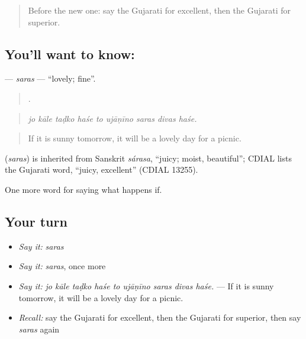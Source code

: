 \label{lesson:GU-C387-saras}



\begin{quote}
Before the new one: say the Gujarati for excellent, then the Gujarati for superior.
\end{quote}

\subsection*{You'll want to know: }
\textbf{} — \emph{saras} — \textquotedblleft{}lovely; fine\textquotedblright{}.

\begin{quote}
        .
\end{quote}

\begin{quote}
\emph{jo kāle taḍko haśe to ujāṇīno saras divas haśe.}
\end{quote}

\begin{quote}
If it is sunny tomorrow, it will be a lovely day for a picnic.
\end{quote}

\begin{cousinweb}
\textbf{} (\emph{saras}) is inherited from Sanskrit \emph{sárasa}, \textquotedblleft{}juicy; moist, beautiful\textquotedblright{}; CDIAL lists the Gujarati word, \textquotedblleft{}juicy, excellent\textquotedblright{} (CDIAL 13255).
\end{cousinweb}

\begin{grammarlens}[title={What you've built}]
One more word for saying what happens if.
\end{grammarlens}

\subsection*{Your turn}
\begin{itemize}
\raggedright
  \item \emph{Say it:} \emph{saras}
  \item \emph{Say it:} \emph{saras}, once more
  \item \emph{Say it:} \emph{jo kāle taḍko haśe to ujāṇīno saras divas haśe.} — If it is sunny tomorrow, it will be a lovely day for a picnic.
  \item \emph{Recall:} say the Gujarati for excellent, then the Gujarati for superior, then say \emph{saras} again
\end{itemize}

